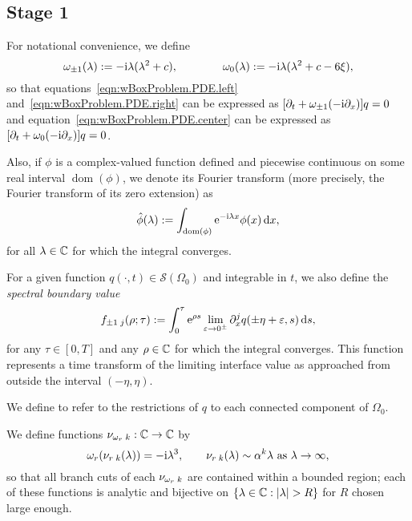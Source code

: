 \documentclass[11pt,reqno,oneside,a4paper]{article}
\begin{document}
\subsection{Stage 1}
For notational convenience, we define
\begin{equation}
    \omega_{\pm1}(\lambda) := -\mathrm{i}\lambda(\lambda^2+c), \qquad\qquad \omega_{0}(\lambda) := -\mathrm{i}\lambda(\lambda^2+c-6\xi),
\end{equation}
so that equations~\eqref{eqn:wBoxProblem.PDE.left} and~\eqref{eqn:wBoxProblem.PDE.right} can be expressed as $[\partial_t+\omega_{\pm1}(-\mathrm{i}\partial_x)]q=0$ and equation~\eqref{eqn:wBoxProblem.PDE.center} can be expressed as $[\partial_t+\omega_{0}(-\mathrm{i}\partial_x)]q=0$.

Also, if $\phi$ is a complex-valued function defined and piecewise continuous on some real interval $\operatorname{dom}(\phi)$, we denote its Fourier transform (more precisely, the Fourier transform of its zero extension) as
\begin{equation}
    \hat{\phi}(\lambda) := \int_{\operatorname{dom}(\phi)}\mathrm{e}^{-\mathrm{i}\lambda x}\phi(x)\,\mathrm{d} x,
\end{equation}
for all $\lambda\in\mathbb C$ for which the integral converges.

For a given function $q(\cdot,t)\in\mathcal{S}(\Omega_0)$ and integrable in $t$, we also define the \emph{spectral boundary value}
\begin{equation}
    f_{\pm1\; j}(\rho;\tau) := \int_0^\tau \mathrm{e}^{\rho s} \lim_{\varepsilon\to0^\pm}\partial_x^j q(\pm\eta+\varepsilon,s) \,\mathrm{d} s,
\end{equation}
for any $\tau\in[0,T]$ and any $\rho\in\mathbb C$ for which the integral converges.
This function represents a time transform of the limiting interface value as approached from outside the interval $(-\eta,\eta)$.

We define
to refer to the restrictions of $q$ to each connected component of $\Omega_0$.

We define functions $\nu_{\omega_r\; k}:\mathbb C\to\mathbb C$ by
\begin{equation}
    \omega_r(\nu_{r\; k}(\lambda)) = -\mathrm{i}\lambda^3, \qquad \nu_{r\; k}(\lambda) \sim \alpha^k\lambda \mbox{ as }\lambda\to\infty,
\end{equation}
so that all branch cuts of each $\nu_{\omega_r\; k}$ are contained within a bounded region; each of these functions is analytic and bijective on $\{\lambda\in\mathbb C:\lvert\lambda\rvert>R\}$ for $R$ chosen large enough.
\end{document}

